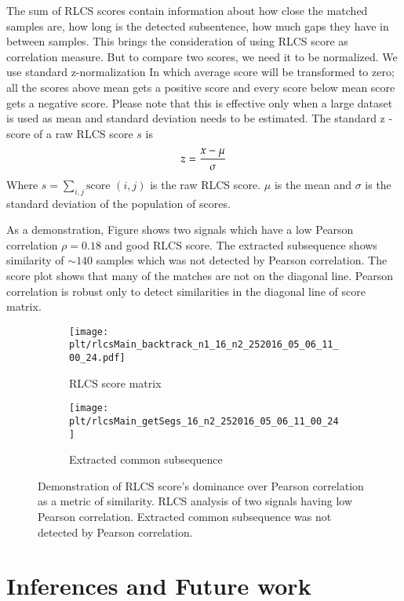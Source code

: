 \documentclass[MTech]{iitmdiss}
\newcommand{\plt}{thesis_plots}
\begin{document}
The sum of RLCS scores contain information about how close the matched samples are, how long is the detected subsentence, how much gaps they have in between samples. This brings the consideration of using RLCS score as correlation measure. But to compare two scores, we need it to be normalized. We use standard z-normalization In which average score will be transformed to zero; all the scores above mean gets a positive score and every score below mean score gets a negative score. Please note that this is effective only when a large dataset is used as mean and standard deviation needs to be estimated. The standard z - score of a raw RLCS score $s$ is
$$z = {x- \mu \over \sigma}$$
Where $s = \sum_{i, j} \text{score } (i, j)$ is the raw RLCS score.
$\mu$ is the mean and $\sigma$ is the standard deviation of the population of scores.

As a demonstration, Figure shows two signals which have a low Pearson correlation $\rho= 0.18$ and good RLCS score. The extracted subsequence shows similarity of $\sim 140$ samples which was not detected by Pearson correlation. The score plot shows that many of the matches are not on the diagonal line. Pearson correlation is robust only to detect similarities in the diagonal line of score matrix.
\begin{figure}[h]
  \begin{subfigure}[b]{0.5\textwidth}
    \texttt{[image: \\plt/rlcsMain\_backtrack\_n1\_16\_n2\_252016\_05\_06\_11\_00\_24.pdf]}
    \caption{RLCS score matrix}
    \label{fig:ori_simple}
  \end{subfigure}%
  \begin{subfigure}[b]{0.5\textwidth}
    \texttt{[image: \\plt/rlcsMain\_getSegs\_16\_n2\_252016\_05\_06\_11\_00\_24]}
    \caption{Extracted common subsequence}
    \label{fig:acfgram_diff}
  \end{subfigure}%
  \caption{Demonstration of RLCS score's dominance over Pearson correlation as a metric of similarity. RLCS analysis of two signals having low Pearson correlation. Extracted common subsequence was not detected by Pearson correlation.}
  \label{fig:oridir_simple}
\end{figure}

\chapter{Inferences and Future work}    %
\label{chap:summary}
\end{document}
